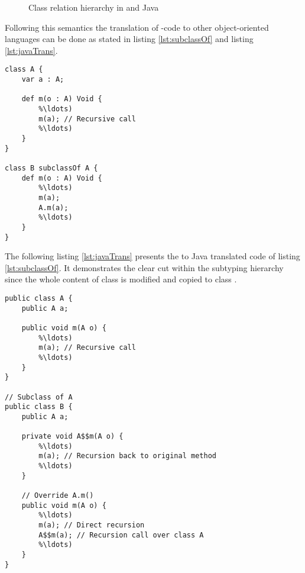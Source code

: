 \begin{figure}[h]
	\centering
	\caption{Class relation hierarchy in \ooplss and Java}
	\label{fig:inheritHierarchy}
\end{figure}


Following this semantics the translation of \ooplss-code to
other object-oriented languages can be done as stated in listing
\ref{lst:subclassOf} and listing \ref{lst:javaTrans}.

\begin{lstlisting}[float,language=ooplss,caption=Subclassing in \ooplss,label=lst:subclassOf]
class A {
	var a : A;

	def m(o : A) Void {
		%\ldots)
		m(a); // Recursive call
		%\ldots)
	}
}

class B subclassOf A {
	def m(o : A) Void {
		%\ldots)
		m(a);
		A.m(a);
		%\ldots)
	}
}
\end{lstlisting}

The following listing \ref{lst:javaTrans} presents the to Java translated
code of listing \ref{lst:subclassOf}. It demonstrates the clear cut within 
the subtyping hierarchy since the whole content of class \A is modified
and copied to class \B.

\begin{lstlisting}[float,caption=Subtyping translated in Java,label=lst:javaTrans]
public class A {
	public A a;

	public void m(A o) {
		%\ldots)
		m(a); // Recursive call
		%\ldots)
	}
}

// Subclass of A
public class B {
	public A a;

	private void A$$m(A o) {
		%\ldots)
		m(a); // Recursion back to original method
		%\ldots)
	}

	// Override A.m()
	public void m(A o) {
		%\ldots)
		m(a); // Direct recursion
		A$$m(a); // Recursion call over class A
		%\ldots)
	}
}
\end{lstlisting}


